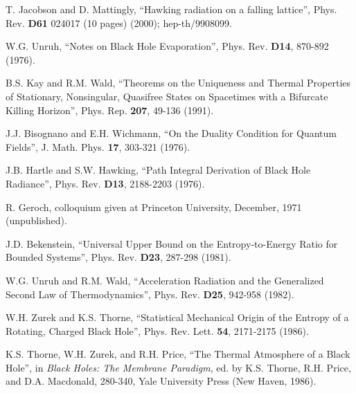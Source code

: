 \documentclass[12pt]{article}
\newcommand{\comment}[1]{}
\newcommand{\keywords}[1]{}
\begin{document}
\begin{thebibliography}{999}
\comment{article} T. Jacobson and D. Mattingly, ``Hawking
radiation on a falling lattice'', Phys. Rev. {\bf D61} 024017 (10
pages) (2000); hep-th/9908099.  \keywords{black holes, quantum field
theory in curved spacetime}

\comment{article} W.G. Unruh, ``Notes on Black Hole
Evaporation'', Phys. Rev. {\bf D14}, 870-892 (1976).
\keywords{black holes, quantum field theory in curved spacetime}

\comment{article} B.S. Kay and R.M. Wald, ``Theorems on the
Uniqueness and Thermal Properties of Stationary, Nonsingular,
Quasifree States on Spacetimes with a Bifurcate Killing Horizon'',
Phys. Rep. {\bf 207}, 49-136 (1991).  \keywords{black holes, quantum
field theory in curved spacetime, Killing horizons}

\comment{article} J.J. Bisognano and E.H. Wichmann, ``On
the Duality Condition for Quantum Fields'', J. Math. Phys. {\bf 17},
303-321 (1976).
\keywords{quantum field theory}

\comment{article} J.B. Hartle and S.W. Hawking, ``Path
Integral Derivation of Black Hole Radiance'', Phys. Rev. {\bf D13},
2188-2203 (1976).  \keywords{black holes, quantum field theory in curved
spacetime}

\comment{unpublished} R. Geroch, colloquium given at
Princeton University, December, 1971 (unpublished).

\comment{article} J.D. Bekenstein, ``Universal Upper Bound
on the Entropy-to-Energy Ratio for Bounded Systems'', Phys. Rev. {\bf
D23}, 287-298 (1981).  \keywords{black hole thermodynamics,
statistical mechanics, generalized second law, entropy bounds}

\comment{article} W.G. Unruh and R.M. Wald, ``Acceleration
Radiation and the Generalized Second Law of Thermodynamics'',
Phys. Rev. {\bf D25}, 942-958 (1982). \keywords{black hole
thermodynamics, quantum field theory in curved spacetime, generalized
second law}

\comment{article} W.H. Zurek and K.S. Thorne,
``Statistical Mechanical Origin of the Entropy of a Rotating, Charged
Black Hole'', Phys. Rev. Lett. {\bf 54}, 2171-2175
(1986). \keywords{black hole thermodynamics, generalized second law}

\comment{inbook} K.S. Thorne, W.H. Zurek, and R.H. Price,
``The Thermal Atmosphere of a Black Hole'', in {\it Black Holes: The
Membrane Paradigm}, ed. by K.S. Thorne, R.H. Price, and
D.A. Macdonald, 280-340, Yale University Press (New Haven, 1986).
\keywords{black hole thermodynamics, generalized second law}


\end{thebibliography}
\end{document}
